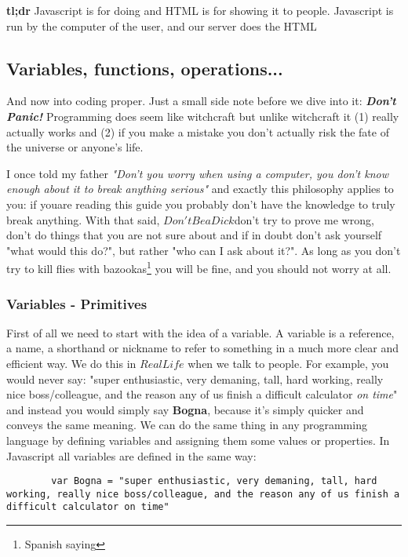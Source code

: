 \large{\textbf{tl;dr}}
Javascript is for doing and HTML is for showing it to people.
Javascript is run by the computer of the user, and our server does the HTML

\subsection{Variables, functions, operations...}
\label{sub:types}

And now into coding proper. Just a small side note before we dive into it: \textit{\textbf{Don't Panic!}} Programming does seem like witchcraft but unlike witchcraft it (1) really actually works and (2) if you make a mistake you don't actually risk the fate of the universe or anyone's life.

I once told my father \textit{"Don't you worry when using a computer, you don't know enough about it to break anything serious"} and exactly this philosophy applies to you: if youare reading this guide you probably don't have the knowledge to truly break anything. With that said, $Don't Be a Dick$\texttrademark don't try to prove me wrong, don't do things that you are not sure about and if in doubt don't ask yourself "what would this do?", but rather "who can I ask about it?".  As long as you don't try to kill flies with bazookas\footnote{Spanish saying} you will be fine, and you should not worry at all.

\subsubsection{Variables - Primitives}
\label{subsub:primitives}
First of all we need to start with the idea of a variable. A variable is a reference, a name, a shorthand or nickname to refer to something in a much more clear and efficient way.  We do this in $Real Life$\texttrademark \vspace{2pt}  when we talk to people. For example, you would never say: "super enthusiastic, very demaning, tall, hard working, really nice boss/colleague, and the reason any of us finish a difficult calculator \textit{on time}" and instead you would simply say \textbf{Bogna}, because it's simply quicker and conveys the same meaning.
We can do the same thing in any programming language by defining variables and assigning them some values or properties. In Javascript all variables are defined in the same way:
\begin{lstlisting}
        var Bogna = "super enthusiastic, very demaning, tall, hard working, really nice boss/colleague, and the reason any of us finish a difficult calculator on time"
\end{lstlisting}

